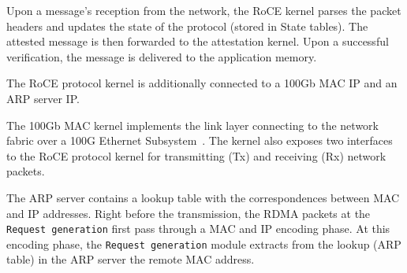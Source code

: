 Upon a message's reception from the network, the RoCE kernel parses the packet headers and updates the state of the protocol (stored in State tables). The attested message is then forwarded to the attestation kernel. Upon a successful verification, the message is delivered to the application memory. 


 The RoCE protocol kernel is additionally connected to a 100Gb MAC IP and an ARP server IP. 

 The 100Gb MAC kernel implements the link layer connecting \projecttitle{} to the network fabric over a 100G Ethernet Subsystem~\cite{license}. The  kernel also exposes two interfaces to the RoCE protocol kernel for transmitting (Tx) and receiving (Rx) network packets. %

 The ARP server contains a lookup table with the correspondences
between MAC and IP addresses. Right before the transmission, the RDMA packets at the {\tt Request generation} first pass through a MAC and IP encoding phase. At this encoding phase, the {\tt Request generation} module extracts from the lookup (ARP table) in the ARP server the remote MAC address.


